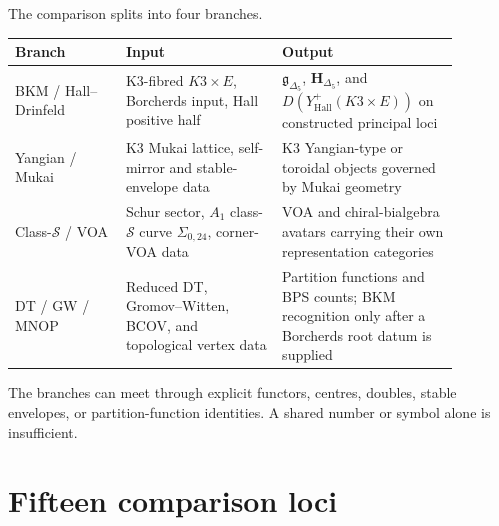 \documentclass[10pt]{article}
\providecommand{\gDelta}{\mathfrak{g}_{\Delta_5}}
\providecommand{\HDelta}{\mathbf{H}_{\Delta_5}}
\begin{document}
The comparison splits into four branches.
\begin{center}
\renewcommand{\arraystretch}{1.18}
\begin{tabular}{p{0.22\linewidth}p{0.31\linewidth}p{0.35\linewidth}}
\toprule
\textbf{Branch} & \textbf{Input} & \textbf{Output}\\
\midrule
BKM / Hall--Drinfeld &
K3-fibred \(K3\times E\), Borcherds input, Hall positive half &
\(\gDelta\), \(\HDelta\), and \(D(Y^+_{\mathrm{Hall}}(K3\times E))\) on
constructed principal loci\\
Yangian / Mukai &
K3 Mukai lattice, self-mirror and stable-envelope data &
K3 Yangian-type or toroidal objects governed by Mukai geometry\\
Class-\(\mathcal S\) / VOA &
Schur sector, \(A_1\) class-\(\mathcal S\) curve \(\Sigma_{0,24}\),
corner-VOA data &
VOA and chiral-bialgebra avatars carrying their own representation
categories\\
DT / GW / MNOP &
Reduced DT, Gromov--Witten, BCOV, and topological vertex data &
Partition functions and BPS counts; BKM recognition only after a
Borcherds root datum is supplied\\
\bottomrule
\end{tabular}
\end{center}
The branches can meet through explicit functors, centres, doubles,
stable envelopes, or partition-function identities.  A shared number or
symbol alone is insufficient.

\section*{Fifteen comparison loci}
\end{document}
